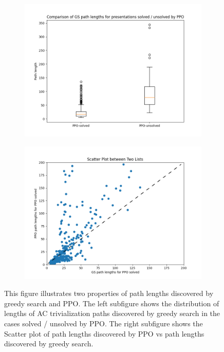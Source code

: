 \begin{figure}
	\centering
	\begin{subfigure}[b]{0.5\textwidth}
		\includegraphics[width=\textwidth]{fig/path_lengths_ppo_solved_vs_unsolved.png}
		\caption{}
		\label{fig:path_lengths_ppo_solved_vs_unsolved}
	\end{subfigure}%
	\begin{subfigure}[b]{0.5\textwidth}
		\centering
		\includegraphics[width=1.1\textwidth]{fig/path_lengths_gs_vs_ppo.png}
		\caption{}
		\label{fig:path_lengths_gs_vs_ppo}
	\end{subfigure}
	\caption{
This figure illustrates two properties of path lengths discovered by greedy search and PPO. The left subfigure shows the distribution of lengths of AC trivialization paths discovered by greedy search in the cases solved / unsolved by PPO. The right subfigure shows the Scatter plot of path lengths discovered by PPO vs path lengths discovered by greedy search.} \label{fig:path_lengths_gs_vs_ppo_full}
\end{figure}


